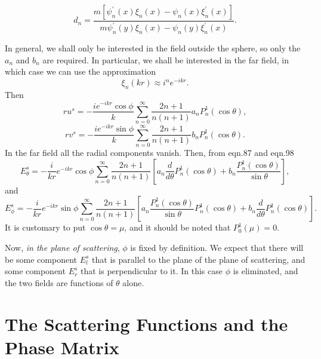 \begin{equation}
d_n=\frac{ m[\psi^\prime_n(x)\xi_n(x)- \psi_n(x) \xi^\prime_n(x)]}{
   m \psi^\prime_n(y) \xi_n(x)- \psi_n(y) \xi^\prime_n(x)}.
\end{equation}

In general, we shall only be interested in the field outside the sphere, so only the $a_n$ and $b_n$ are required. In particular, we shall be interested in the far field, in which case we can use the approximation
\begin{equation}
\xi_n(kr) \approx i^n e^{-ikr}.
\end{equation}
Then
\begin{equation}
r u^s=-\frac{ i e^{-ikr} \cos \phi}{k}
\sum_{n=0}^\infty 
\frac{2n+1}{n(n+1)} a_n
P^1_n(\cos \theta),
\end{equation}
\begin{equation}
r v^s=-\frac{ i e^{-ikr} \sin \phi}{k}
\sum_{n=0}^\infty 
\frac{2n+1}{n(n+1)} b_n
P^1_n(\cos \theta).
\end{equation}
In the far field all the radial components vanish.
Then, from eqn.87 and eqn.98
\begin{equation}
E^s_\theta=-\frac{i}{kr} e^{-ikr} \cos \phi \sum_{n=0}^\infty
\frac{2n+1}{n(n+1)}
\left \lbrack a_n \frac{d}{d \theta} P^1_n( \cos \theta)
 +b_n \frac{P^1_n(\cos \theta)}{ \sin \theta} \right \rbrack,
\end{equation}
and
\begin{equation}
E^s_\phi=-\frac{i}{kr} e^{-ikr} \sin \phi \sum_{n=0}^\infty
\frac{2n+1}{n(n+1)}
\left \lbrack a_n \frac{P^1_n( \cos \theta)}{\sin \theta} P^1_n( \cos \theta)
 +b_n \frac{ d}{ d \theta} P^1_n(\cos \theta) \right \rbrack.
\end{equation}
It is customary to put $\cos \theta=\mu$, and it should be noted that $P^1_0(\mu)=0.$ 

Now, {\it in the plane of scattering}, $\phi$ is fixed by definition. We expect that there will be some component $E^s_l$ that is parallel to the plane of the plane of scattering, and some component $E^s_r$ that is perpendicular to it. In this case $\phi$ is eliminated, and the two fields are functions of $\theta$ alone.

\section{The Scattering Functions and the Phase Matrix}

